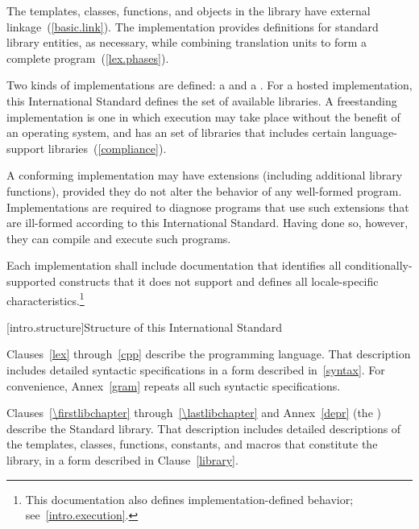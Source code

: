 \pnum
The templates, classes, functions, and objects in the library have
external linkage~(\ref{basic.link}). The implementation provides
definitions for standard library entities, as necessary, while combining
translation units to form a complete \Cpp  program~(\ref{lex.phases}).%

\pnum
Two kinds of implementations are defined: a  and a
. For a hosted implementation, this
International Standard defines the set of available libraries. A freestanding
implementation is one in which execution may take place without the benefit of
an operating system, and has an  set of libraries that includes certain language-support
libraries~(\ref{compliance}).

\pnum
A conforming implementation may have extensions (including
additional library functions), provided they do not alter the
behavior of any well-formed program.
Implementations are required to diagnose programs that use such
extensions that are ill-formed according to this International Standard.
Having done so, however, they can compile and execute such programs.

\pnum
Each implementation shall include documentation that identifies all
conditionally-supported constructs
that it does not support and defines all locale-specific characteristics.\footnote{This documentation also defines implementation-defined behavior;
see~\ref{intro.execution}.}%
%
%

[intro.structure]{Structure of this International Standard}

\pnum
{}%
%
Clauses~\ref{lex} through~\ref{cpp} describe the \Cpp  programming
language. That description includes detailed syntactic specifications in
a form described in~\ref{syntax}. For convenience, Annex~\ref{gram}
repeats all such syntactic specifications.

\pnum
Clauses~\ref{\firstlibchapter} through~\ref{\lastlibchapter} and Annex~\ref{depr}
(the ) describe the Standard \Cpp  library.
That description includes detailed descriptions of the templates, classes, functions, constants, and macros that constitute the library, in a form described in Clause~\ref{library}.


